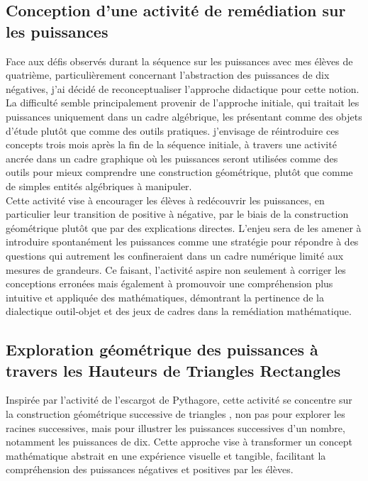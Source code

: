 \subsection{Conception d'une activité de remédiation sur les puissances}

Face aux défis observés durant la séquence sur les puissances avec mes élèves de quatrième,
particulièrement concernant l'abstraction des puissances de dix négatives,
j'ai décidé de reconceptualiser l'approche didactique pour cette notion.
La difficulté semble principalement provenir de l'approche initiale,
qui traitait les puissances uniquement dans un cadre algébrique,
les présentant comme des objets d'étude plutôt que comme des outils pratiques.
j'envisage de réintroduire ces concepts trois mois après la fin de la séquence initiale,
à travers une activité  ancrée dans un cadre graphique où les puissances seront utilisées comme des outils pour mieux comprendre une construction géométrique,
plutôt que comme de simples entités algébriques à manipuler.\\

Cette activité vise à encourager les élèves à redécouvrir les puissances,
en particulier leur transition de positive à négative,
par le biais de la construction géométrique plutôt que par des explications directes.
L'enjeu sera de les amener à introduire spontanément les puissances comme une stratégie pour répondre à des questions qui autrement les confineraient dans un cadre numérique limité aux mesures de grandeurs.
Ce faisant,
l'activité aspire non seulement à corriger les conceptions erronées mais également à promouvoir une compréhension plus intuitive et appliquée des mathématiques,
démontrant la pertinence de la dialectique outil-objet et des jeux de cadres dans la remédiation mathématique.

\subsection{Exploration géométrique des puissances à travers les Hauteurs de Triangles Rectangles}

Inspirée par l'activité de l'escargot de Pythagore,
cette activité se concentre sur la construction géométrique successive de triangles \cite{villemin},
non pas pour explorer les racines successives,
mais pour illustrer les puissances successives d'un nombre,
notamment les puissances de dix.
Cette approche vise à transformer un concept mathématique abstrait en une expérience visuelle et tangible,
facilitant la compréhension des puissances négatives et positives par les élèves.\\


